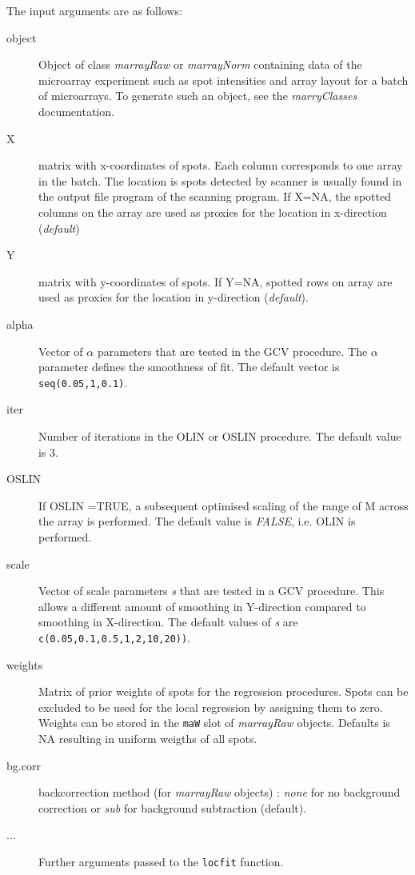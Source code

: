 \documentclass[a4paper,11pt]{article}
\begin{document}
\noindent The input arguments are  as follows:
           \begin{description}
           \item[object] Object of class \emph{marrayRaw} or \emph{marrayNorm} containing 
                         data of the microarray experiment such as spot intensities and array layout
                         for a batch of microarrays.
                         To generate such an object, see the \emph{marryClasses} documentation.
           \item[X]      matrix with x-coordinates of spots. Each column corresponds to one array in the batch. The location is spots detected by scanner
                         is usually 
                         found in the output file program of  the scanning program. 
                          If X=NA, the spotted columns on the  array are used as proxies for the location in x-direction (\emph{default})
           \item[Y] matrix with y-coordinates of spots. If Y=NA, spotted rows on array are used
            as proxies for the location in y-direction (\emph{default}).
           \item[alpha] Vector of $\alpha$  parameters that are tested in the GCV procedure. The $\alpha$  parameter 
                  defines the smoothness of fit.  The default vector is \texttt{seq(0.05,1,0.1)}.
           \item[iter] Number of iterations in the OLIN or OSLIN procedure. The default value is 3. 
           \item[OSLIN] If OSLIN =TRUE, a subsequent optimised scaling of the range of M across the array
                        is performed.
                         The default value is \emph{FALSE}, i.e. OLIN is performed. 
           \item[scale] Vector of scale parameters \emph{s} that are tested in a GCV procedure. 
                    This  allows  a different amount of smoothing in Y-direction compared 
                    to smoothing in X-direction. The default values of \emph{s} are 
                    \texttt{c(0.05,0.1,0.5,1,2,10,20))}.
           \item[weights] Matrix of prior weights of spots for the regression procedures.
                          Spots can be excluded to be used
                          for the local regression by assigning them to zero. Weights can be stored
                          in the \texttt{maW} slot of  \emph{marrayRaw} objects. Defaults is NA resulting
                          in uniform weigths of all spots. 
            \item[bg.corr] backcorrection method (for \emph{marrayRaw} objects)  :
			\emph{none} for no background correction or \emph{sub} 
                          for background subtraction (default).

          \item[...] Further arguments passed to the  \texttt{locfit} function.	
      \end{description}
\end{document}
